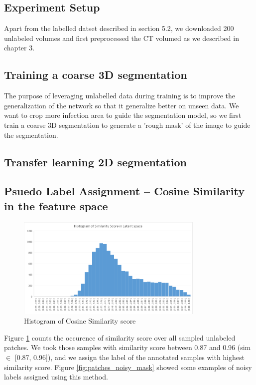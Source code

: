 \subsection{Experiment Setup}
Apart from the labelled datset described in section 5.2, we downloaded 200 unlabeled volumes and first preprocessed the CT volumed as we described in chapter 3.

\subsection{Training a coarse 3D segmentation}
The purpose of leveraging unlabelled data during training is to improve the generalization of the network so that it generalize better on unseen data. We want to crop more infection area to guide the segmentation model, so we first train a coarse 3D segmentation to generate a 'rough mask' of the image to guide the segmentation.
\subsection{Transfer learning 2D segmentation}

\subsection{Psuedo Label Assignment -- Cosine Similarity in the feature space}
\begin{figure}[h]
	\centering
	\includegraphics[width=0.8\textwidth]{img/semi-experiment/cosine_sim_histogram}
	\caption{Histogram of Cosine Similarity score}
	\label{fig:score_hist}
\end{figure}

Figure \ref{fig:score_hist} counts the occurence of similarity score over all sampled unlabeled patches. We took those samples with similarity score between 0.87 and 0.96 (sim $\in$ [0.87, 0.96]), and we assign the label of the annotated samples with highest similarity score. Figure \ref{fig:patches_noisy_mask} showed some examples of noisy labels assigned using this method.	

